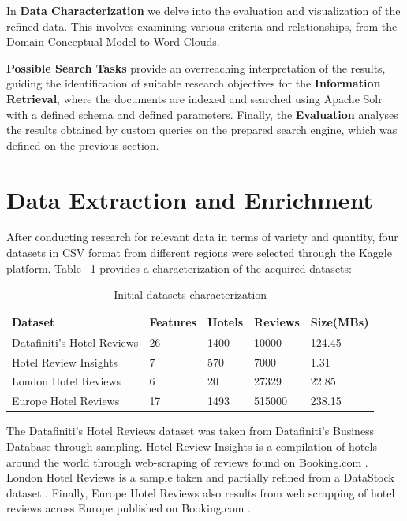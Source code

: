 \documentclass[sigconf]{acmart}
\begin{document}
In \textbf{Data Characterization} we delve into the evaluation and visualization of the refined data. This involves examining various criteria and relationships, from the Domain Conceptual Model to Word Clouds.

\textbf{Possible Search Tasks} provide an overreaching interpretation of the results, guiding the identification of suitable research objectives for the \textbf{Information Retrieval}, where the documents are indexed and searched using Apache Solr \cite{Apache_Solr} with a defined schema and defined parameters. Finally, the \textbf{Evaluation} analyses the results obtained by custom queries on the prepared search engine, which was defined on the previous section.

\section{Data Extraction and Enrichment}

After conducting research for relevant data in terms of variety and quantity, four datasets in CSV format from different regions were selected through the Kaggle \cite{kaggle} platform. Table ~\ref{tab:initFreq} provides a characterization of the acquired datasets:

\begin{table}[h]
\small
\caption{Initial datasets characterization}
\label{tab:initFreq}
\begin{tabular}{lllll}
\toprule
Dataset & Features & Hotels & Reviews & Size(MBs)\\
\midrule
Datafiniti's Hotel Reviews & 26 & 1400 & 10000 & 124.45 \\
Hotel Review Insights & 7 & 570 & 7000 & 1.31 \\
London Hotel Reviews & 6 & 20 & 27329 & 22.85 \\
Europe Hotel Reviews & 17 & 1493 & 515000 & 238.15 \\
\bottomrule
\end{tabular}
\end{table}


The Datafiniti's Hotel Reviews \cite{Datafiniti's_Hotel_Reviews} dataset was taken from Datafiniti's Business Database \cite{Datafiniti's_Business_Database} through sampling. Hotel Review Insights \cite{Hotel_Review_Insights} is a compilation of hotels around the world through web-scraping of reviews found on Booking.com \cite{Booking}. London Hotel Reviews \cite{London_Hotel_Reviews} is a sample taken and partially refined from a DataStock dataset \cite{DataStock}. Finally, Europe Hotel Reviews \cite{Europe_Hotel_Reviews} also results from web scrapping of hotel reviews across Europe published on Booking.com \cite{Booking}.
\end{document}

